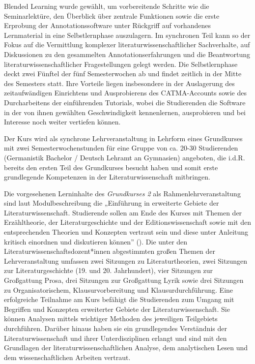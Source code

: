 \documentclass[
          a4paper,
        ]{article}
\begin{document}
Blended Learning wurde gewählt, um vorbereitende Schritte wie die
Seminarlektüre, den Überblick über zentrale Funktionen sowie die erste
Erprobung der Annotationssoftware unter Rückgriff auf vorhandenes
Lernmaterial in eine Selbstlernphase auszulagern. Im synchronen Teil
kann so der Fokus auf die Vermittlung komplexer
literaturwissenschaftlicher Sachverhalte, auf Diskussionen zu den
gesammelten Annotationserfahrungen und die Beantwortung
literaturwissenschaftlicher Fragestellungen gelegt werden. Die
Selbstlernphase deckt zwei Fünftel der fünf Semesterwochen ab und findet
zeitlich in der Mitte des Semesters statt. Ihre Vorteile liegen
insbesondere in der Auslagerung des zeitaufwändigen Einrichtens und
Ausprobierens des CATMA-Accounts sowie des Durcharbeitens der
einführenden Tutorials, wobei die Studierenden die Software in der von
ihnen gewählten Geschwindigkeit kennenlernen, ausprobieren und bei
Interesse noch weiter vertiefen können.

Der Kurs wird als synchrone Lehrveranstaltung in Lehrform eines
Grundkurses mit zwei Semesterwochenstunden für eine Gruppe von ca. 20-30
Studierenden (Germanistik Bachelor / Deutsch Lehramt an Gymnasien)
angeboten, die i.d.R. bereits den ersten Teil des Grundkurses besucht
haben und somit erste grundlegende Kompetenzen in der
Literaturwissenschaft mitbringen.

Die vorgesehenen Lerninhalte des \emph{Grundkurses 2} als
Rahmenlehrveranstaltung sind laut Modulbeschreibung die „Einführung in
erweiterte Gebiete der Literaturwissenschaft. Studierende sollen am Ende
des Kurses mit Themen der Erzähltheorie, der Literaturgeschichte und der
Editionswissenschaft sowie mit den entsprechenden Theorien und Konzepten
vertraut sein und diese unter Anleitung kritisch einordnen und
diskutieren können'' (). Die unter den
Literaturwissenschaftsdozent*innen abgestimmten großen Themen der
Lehrveranstaltung umfassen zwei Sitzungen zu Literaturtheorien, zwei
Sitzungen zur Literaturgeschichte (19. und 20. Jahrhundert), vier
Sitzungen zur Großgattung Prosa, drei Sitzungen zur Großgattung Lyrik
sowie drei Sitzungen zu Organisatorischem, Klausurvorbereitung und
Klausurdurchführung. Eine erfolgreiche Teilnahme am Kurs befähigt die
Studierenden zum Umgang mit Begriffen und Konzepten erweiterter Gebiete
der Literaturwissenschaft. Sie können Analysen mittels wichtiger
Methoden des jeweiligen Teilgebiets durchführen. Darüber hinaus haben
sie ein grundlegendes Verständnis der Literaturwissenschaft und ihrer
Unterdisziplinen erlangt und sind mit den Grundlagen der
literaturwissenschaftlichen Analyse, dem analytischen Lesen und dem
wissenschaftlichen Arbeiten vertraut.
\end{document}
